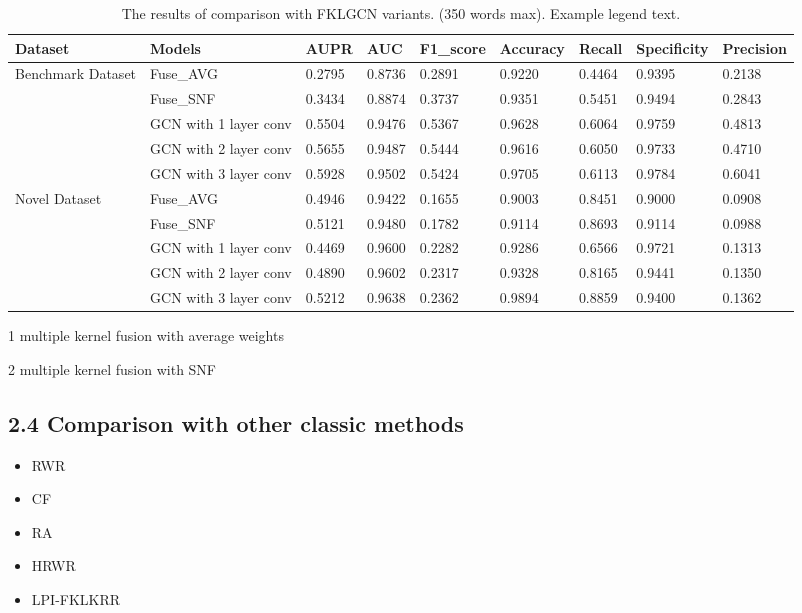 \documentclass[fleqn,10pt]{wlscirep}
\begin{document}
\begin{table}[ht]
\centering
 \caption{\label{tab:parameter1}The results of comparison with FKLGCN variants. (350 words max). Example legend text.}
\begin{threeparttable}[b]
\begin{tabular}{|l|l|l|l|l|l|l|l|l|}
\hline
Dataset & Models & AUPR & AUC &	F1_score & Accuracy	& Recall & Specificity & Precision\\
\hline
\multirow{4}{6em}{Benchmark Dataset} 
& Fuse_AVG\tnote{1} & 0.2795 & 0.8736 & 0.2891 & 0.9220 & 0.4464 & 0.9395 & 0.2138\\
& Fuse_SNF\tnote{2} & 0.3434	& 0.8874 & 0.3737	& 0.9351 & 0.5451	& 0.9494 & 0.2843\\
& GCN with 1 layer conv & 0.5504 & 0.9476 & 0.5367 & 0.9628 & 0.6064 & 0.9759 & 0.4813\\ 
& GCN with 2 layer conv & 0.5655 & 0.9487 & 0.5444 & 0.9616 & 0.6050 & 0.9733 & 0.4710\\
& GCN with 3 layer conv& 0.5928 & 0.9502 & 0.5424 & 0.9705 & 0.6113 & 0.9784 & 0.6041\\
\hline
\multirow{4}{6em}{Novel Dataset} 
& Fuse_AVG\tnote{1} & 0.4946 & 0.9422 & 0.1655 & 0.9003 & 0.8451 & 0.9000 & 0.0908\\
& Fuse_SNF\tnote{2} & 0.5121 & 0.9480 & 0.1782 & 0.9114 & 0.8693 & 0.9114	& 0.0988\\
& GCN with 1 layer conv & 0.4469 & 0.9600 & 0.2282 & 0.9286 & 0.6566 & 0.9721 & 0.1313\\ 
& GCN with 2 layer conv & 0.4890 & 0.9602 & 0.2317 & 0.9328 & 0.8165 & 0.9441 & 0.1350\\
& GCN with 3 layer conv & 0.5212 & 0.9638 & 0.2362 & 0.9894 & 0.8859 & 0.9400 & 0.1362\\
\hline
\end{tabular}
\begin{tablenotes}
     \item[1] multiple kernel fusion with average weights
     \item[2] multiple kernel fusion with SNF
     \end{tablenotes}
     \end{threeparttable}
\end{table}


\subsection*{2.4 Comparison with other classic methods}
\begin{itemize}
\item RWR
\item CF
\item RA
\item HRWR
\item LPI-FKLKRR
\end{itemize}
\end{document}

